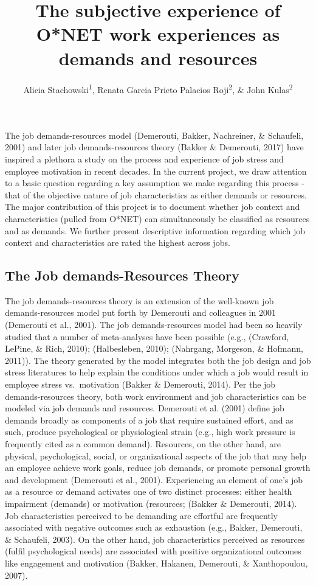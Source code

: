 \documentclass[
  english,
  man]{apa6}
\title{The subjective experience of O*NET work experiences as demands and resources}
\author{Alicia Stachowski\textsuperscript{1}, Renata Garcia Prieto Palacios Roji\textsuperscript{2}, \& John Kulas\textsuperscript{2}}
\date{}
\affiliation{\vspace{0.5cm}\textsuperscript{1} University of Wisconsin - Stout\\\textsuperscript{2} Montclair State University}
\begin{document}
\maketitle

The job demands-resources model (Demerouti, Bakker, Nachreiner, \& Schaufeli, 2001) and later job demands-resources theory (Bakker \& Demerouti, 2017) have inspired a plethora a study on the process and experience of job stress and employee motivation in recent decades. In the current project, we draw attention to a basic question regarding a key assumption we make regarding this process - that of the objective nature of job characteristics as either demands or resources. The major contribution of this project is to document whether job context and characteristics (pulled from O*NET) can simultaneously be classified as resources and as demands. We further present descriptive information regarding which job context and characteristics are rated the highest across jobs.

\hypertarget{the-job-demands-resources-theory}{%
\subsection{The Job demands-Resources Theory}\label{the-job-demands-resources-theory}}

The job demands-resources theory is an extension of the well-known job demands-resources model put forth by Demerouti and colleagues in 2001 (Demerouti et al., 2001). The job demands-resources model had been so heavily studied that a number of meta-analyses have been possible (e.g., (Crawford, LePine, \& Rich, 2010);
(Halbesleben, 2010); (Nahrgang, Morgeson, \& Hofmann, 2011)). The theory generated by the model integrates both the job design and job stress literatures to help explain the conditions under which a job would result in employee stress vs.~motivation (Bakker \& Demerouti, 2014). Per the job demands-resources theory, both work environment and job characteristics can be modeled via job demands and resources. Demerouti et al. (2001) define job demands broadly as components of a job that require sustained effort, and as such, produce psychological or physiological strain (e.g., high work pressure is frequently cited as a common demand). Resources, on the other hand, are physical, psychological, social, or organizational aspects of the job that may help an employee achieve work goals, reduce job demands, or promote personal growth and development (Demerouti et al., 2001).
Experiencing an element of one's job as a resource or demand activates one of two distinct processes: either health impairment (demands) or motivation (resources; (Bakker \& Demerouti, 2014). Job characteristics perceived to be demanding are effortful are frequently associated with negative outcomes such as exhaustion (e.g., Bakker, Demerouti, \& Schaufeli, 2003). On the other hand, job characteristics perceived as resources (fulfil psychological needs) are associated with positive organizational outcomes like engagement and motivation (Bakker, Hakanen, Demerouti, \& Xanthopoulou, 2007).
\end{document}
